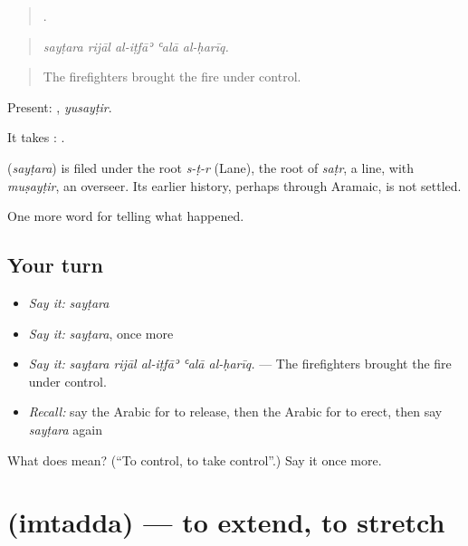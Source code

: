 \begin{quote}
    .
\end{quote}

\begin{quote}
\emph{sayṭara rijāl al-iṭfāʾ ʿalā al-ḥarīq.}
\end{quote}

\begin{quote}
The firefighters brought the fire under control.
\end{quote}

Present: , \emph{yusayṭir}.

It takes :  .

\begin{cousinweb}
\textbf{} (\emph{sayṭara}) is filed under the root \emph{s-ṭ-r} (Lane), the root of \emph{saṭr}, a line, with \emph{muṣayṭir}, an overseer. Its earlier history, perhaps through Aramaic, is not settled.
\end{cousinweb}

\begin{grammarlens}[title={What you've built}]
One more word for telling what happened.
\end{grammarlens}

\subsection*{Your turn}
\begin{itemize}
\raggedright
  \item \emph{Say it:} \emph{sayṭara}
  \item \emph{Say it:} \emph{sayṭara}, once more
  \item \emph{Say it:} \emph{sayṭara rijāl al-iṭfāʾ ʿalā al-ḥarīq.} — The firefighters brought the fire under control.
  \item \emph{Recall:} say the Arabic for to release, then the Arabic for to erect, then say \emph{sayṭara} again
\end{itemize}

\begin{tcolorbox}[breakable,colback=teal!4,colframe=teal!35!black,title={Before you move on}]
What does  mean? (\textquotedblleft{}To control, to take control\textquotedblright{}.) Say it once more.
\end{tcolorbox}
\section[\texorpdfstring{\ar{امتد} (imtadda)}{امتد (imtadda)}]{ (imtadda) — to extend, to stretch}

